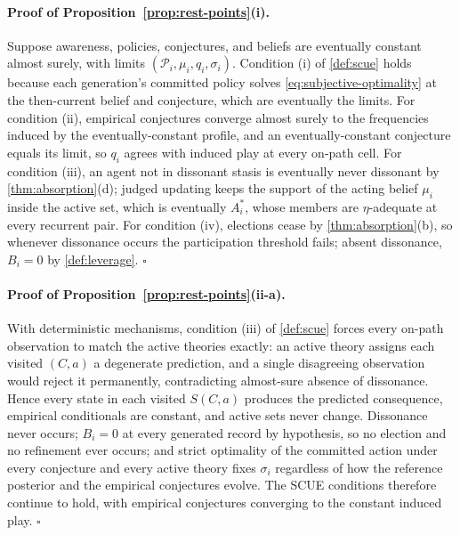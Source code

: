 \documentclass[11pt]{article}
\theoremstyle{definition}
\begin{document}
\paragraph{Proof of Proposition~\ref{prop:rest-points}(i).}
Suppose awareness, policies, conjectures, and beliefs are eventually
constant almost surely, with limits $(\mathcal P_i,\mu_i,q_i,\sigma_i)$.
Condition (i) of \cref{def:scue} holds because each generation's committed
policy solves \cref{eq:subjective-optimality} at the then-current belief
and conjecture, which are eventually the limits.  For condition (ii),
empirical conjectures converge almost surely to the frequencies induced by
the eventually-constant profile, and an eventually-constant conjecture
equals its limit, so $q_i$ agrees with induced play at every on-path cell.
For condition (iii), an agent not in dissonant stasis is eventually never
dissonant by \cref{thm:absorption}(d); judged updating keeps the support of
the acting belief $\mu_i$ inside the active set, which is eventually
$A_i^{*}$, whose members are $\eta$-adequate at every recurrent pair.  For
condition (iv), elections cease by \cref{thm:absorption}(b), so whenever
dissonance occurs the participation threshold fails; absent dissonance,
$B_i=0$ by \cref{def:leverage}.  \hfill$\square$

\paragraph{Proof of Proposition~\ref{prop:rest-points}(ii-a).}
With deterministic mechanisms, condition (iii) of \cref{def:scue} forces
every on-path observation to match the active theories exactly: an active
theory assigns each visited $(C,a)$ a degenerate prediction, and a single
disagreeing observation would reject it permanently, contradicting
almost-sure absence of dissonance.  Hence every state in each visited
$S(C,a)$ produces the predicted consequence, empirical conditionals are
constant, and active sets never change.  Dissonance never occurs; $B_i=0$
at every generated record by hypothesis, so no election and no refinement
ever occurs; and strict optimality of the committed action under every
conjecture and every active theory fixes $\sigma_i$ regardless of how the
reference posterior and the empirical conjectures evolve.  The SCUE
conditions therefore continue to hold, with empirical conjectures
converging to the constant induced play.  \hfill$\square$
\end{document}
